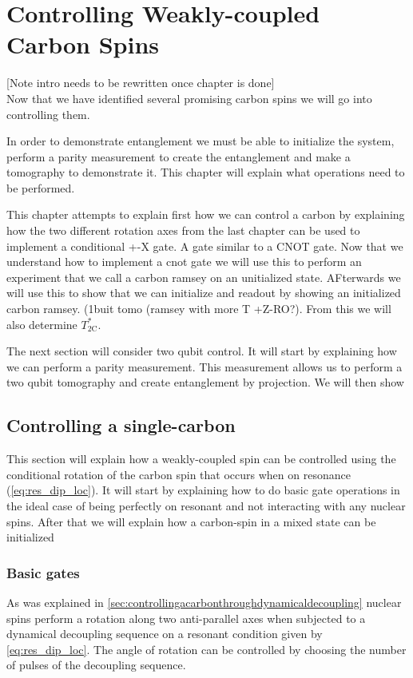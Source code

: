 \chapter{Controlling Weakly-coupled Carbon Spins}
[Note intro needs to be rewritten once chapter is done]\\
Now that we have identified several promising carbon spins we will go into controlling them.

In order to demonstrate entanglement we must be able to initialize the system, perform a parity measurement to create the entanglement and make a tomography to demonstrate it.
This chapter will explain what operations need to be performed.

This chapter attempts to explain first how we can control a carbon by explaining how the two different rotation axes from the last chapter can be used to implement a conditional +-X gate. A gate similar to a CNOT gate.
Now that we understand how to implement a cnot gate we will use this to perform an experiment that we call a carbon ramsey on an unitialized state.
AFterwards we will use this to show that we can initialize and readout by showing an initialized carbon ramsey. (1buit tomo (ramsey with more T +Z-RO?).
From this we will also determine $T_{2 \mathrm{C}}^*$.

The next section will consider two qubit control.
It will start by explaining how we can perform a parity measurement. This measurement allows us to perform a two qubit tomography and create entanglement by projection.
We will then show

\section{Controlling a single-carbon}
This section will explain how a weakly-coupled spin can be controlled using the conditional rotation of the carbon spin that occurs when on resonance (\cref{eq:res_dip_loc}).
It will start by explaining how to do basic gate operations in the ideal case of being perfectly on resonant and not interacting with any nuclear spins.
After that we will explain how a carbon-spin in a mixed state can be initialized

\subsection{Basic gates}
As was explained in \cref{sec:controllingacarbonthroughdynamicaldecoupling} nuclear spins perform a rotation along two anti-parallel axes when subjected to a dynamical decoupling sequence on a resonant condition given by \cref{eq:res_dip_loc}.
The angle of rotation can be controlled by choosing the number of pulses of the decoupling sequence.


